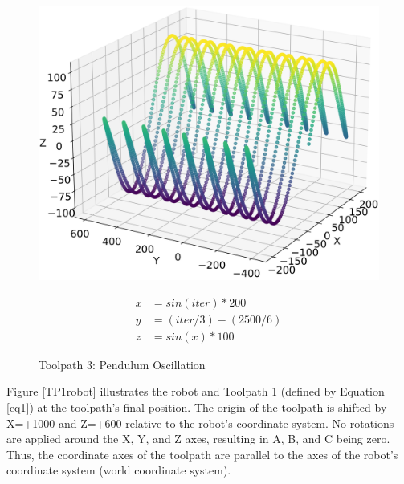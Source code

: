\begin{figure}[H]%
	\centering
	\begin{minipage}{0.5\textwidth}
		\includegraphics[width=\textwidth]{figures/path3.png}
		\caption{Toolpath 3: Pendulum Oscillation}
		\label{path3}
	\end{minipage}\hfill
	\begin{minipage}{0.5\textwidth}
		\begin{equation}\label{eq3}
			\begin{split}
				x &= sin(iter) * 200\\
				y &= (iter / 3) - (2500/6)\\
				z &= sin(x)*100
			\end{split}
		\end{equation}
	\end{minipage}\par
\end{figure}


Figure \ref{TP1robot} illustrates the robot and Toolpath 1 (defined by Equation \ref{eq1}) at the toolpath's final position. The origin of the toolpath is shifted by X=+1000 and Z=+600 relative to the robot's coordinate system. No rotations are applied around the X, Y, and Z axes, resulting in A, B, and C being zero. Thus, the coordinate axes of the toolpath are parallel to the axes of the robot's coordinate system (world coordinate system).



